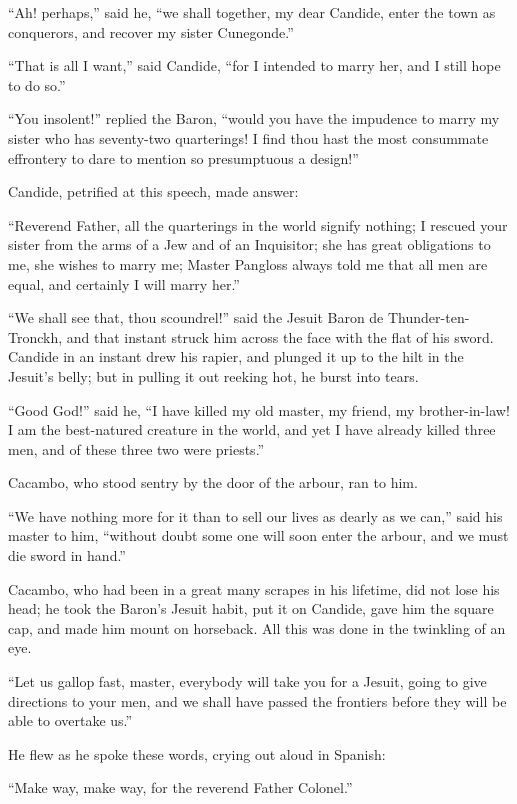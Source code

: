 ``Ah! perhaps,'' said he, ``we shall together, my dear Candide, enter the town as conquerors, and recover my sister Cunegonde.''

``That is all I want,'' said Candide, ``for I intended to marry her, and I still hope to do so.''

``You insolent!'' replied the Baron, ``would you have the impudence to marry my sister who has seventy-two quarterings! I find thou hast the most consummate effrontery to dare to mention so presumptuous a design!''

Candide, petrified at this speech, made answer:

``Reverend Father, all the quarterings in the world signify nothing; I rescued your sister from the arms of a Jew and of an Inquisitor; she has great obligations to me, she wishes to marry me; Master Pangloss always told me that all men are equal, and certainly I will marry her.''

``We shall see that, thou scoundrel!'' said the Jesuit Baron de Thunder-ten-Tronckh, and that instant struck him across the face with the flat of his sword. Candide in an instant drew his rapier, and plunged it up to the hilt in the Jesuit's belly; but in pulling it out reeking hot, he burst into tears.

``Good God!'' said he, ``I have killed my old master, my friend, my brother-in-law! I am the best-natured creature in the world, and yet I have already killed three men, and of these three two were priests.''

Cacambo, who stood sentry by the door of the arbour, ran to him.

``We have nothing more for it than to sell our lives as dearly as we can,'' said his master to him, ``without doubt some one will soon enter the arbour, and we must die sword in hand.''

Cacambo, who had been in a great many scrapes in his lifetime, did not lose his head; he took the Baron's Jesuit habit, put it on Candide, gave him the square cap, and made him mount on horseback. All this was done in the twinkling of an eye.

``Let us gallop fast, master, everybody will take you for a Jesuit, going to give directions to your men, and we shall have passed the frontiers before they will be able to overtake us.''

He flew as he spoke these words, crying out aloud in Spanish:

``Make way, make way, for the reverend Father Colonel.''

